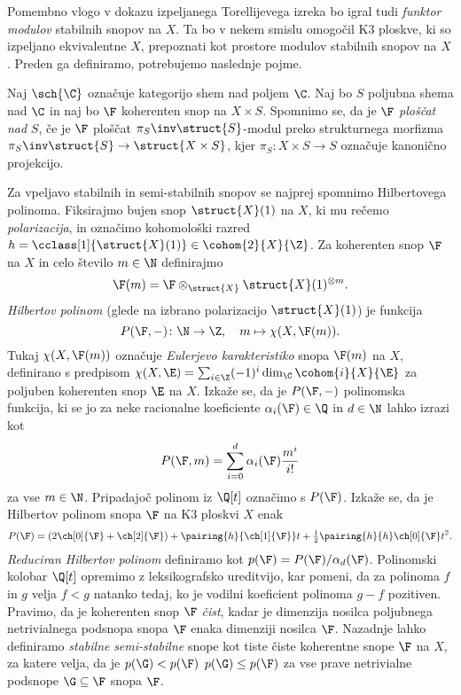 Pomembno vlogo v dokazu izpeljanega Torellijevega izreka bo igral tudi \emph{funktor modulov} stabilnih snopov na $X$. Ta bo v nekem smislu omogočil K3 ploskve, ki so izpeljano ekvivalentne $X$, prepoznati kot prostore modulov stabilnih snopov na $X$. Preden ga definiramo, potrebujemo naslednje pojme. 

Naj $\sch{\C}$ označuje kategorijo shem nad poljem $\C$. Naj bo $S$ poljubna shema nad $\C$ in naj bo $\F$ koherenten snop na $X \times S$. Spomnimo se, da je $\F$ \emph{ploščat nad} $S$, če je $\F$ ploščat $\pi_S\inv\struct{S}$-modul preko strukturnega morfizma $\pi_S\inv\struct{S} \to \struct{X \times S}$, kjer $\pi_S \colon X \times S \to S$ označuje kanonično projekcijo. 

Za vpeljavo stabilnih in semi-stabilnih snopov se najprej spomnimo Hilbertovega polinoma. Fiksirajmo bujen snop $\struct{X}(1)$ na $X$, ki mu rečemo \emph{polarizacija}, in označimo kohomološki razred $h = \cclass[1]{\struct{X}(1)} \in \cohom{2}{X}{\Z}$. Za koherenten snop $\F$ na $X$ in celo število $m \in \N$ definirajmo
\[
    \F(m) = \F \otimes_{\struct{X}} \struct{X}(1)^{\otimes m}.
\]
\emph{Hilbertov polinom} (glede na izbrano polarizacijo $\struct{X}(1)$) je funkcija
\[
    P(\F, -) \colon \N \to \Z, \quad m \mapsto \chi(X, \F(m)). 
\]
Tukaj $\chi(X, \F(m))$ označuje \emph{Eulerjevo karakteristiko} snopa $\F(m)$ na $X$, definirano s predpisom $\chi(X, \E) = \sum_{i \in \Z} (-1)^i \dim_\C \cohom{i}{X}{\E}$ za poljuben koherenten snop $\E$ na $X$. Izkaže se, da je $P(\F, -)$ polinomska funkcija, ki se jo za neke racionalne koeficiente $\alpha_i(\F) \in \Q$ in $d \in \N$ lahko izrazi kot 
\[
    P(\F, m) = \sum_{i = 0}^d \alpha_i(\F) \frac{m^i}{i!}
\]
za vse $m \in \N$. Pripadajoč polinom iz $\Q[t]$ označimo s $P(\F)$. Izkaže se, da je Hilbertov polinom snopa $\F$ na K3 ploskvi $X$ enak
\[
    P(\F) = (2\ch[0]{\F} + \ch[2]{\F}) + \pairing{h}{\ch[1]{\F}}t + \tfrac{1}{2}\pairing{h}{h}\ch[0]{\F}t^2.
\]
\emph{Reduciran Hilbertov polinom} definiramo kot $p(\F) = P(\F)/\alpha_d(\F)$. Polinomski kolobar $\Q[t]$ opremimo z leksikografsko ureditvijo, kar pomeni, da za polinoma $f$ in $g$ velja $f < g$ natanko tedaj, ko je vodilni koeficient polinoma $g - f$ pozitiven. Pravimo, da je koherenten snop $\F$ \emph{čist}, kadar je dimenzija nosilca poljubnega netrivialnega podsnopa snopa $\F$ enaka dimenziji nosilca $\F$. Nazadnje lahko definiramo \emph{stabilne} \oz \emph{semi-stabilne} snope kot tiste čiste koherentne snope $\F$ na $X$, za katere velja, da je $p(\G) < p(\F)$ \oz $p(\G) \leq p(\F)$ za vse prave netrivialne podsnope $\G \subseteq \F$ snopa $\F$.

